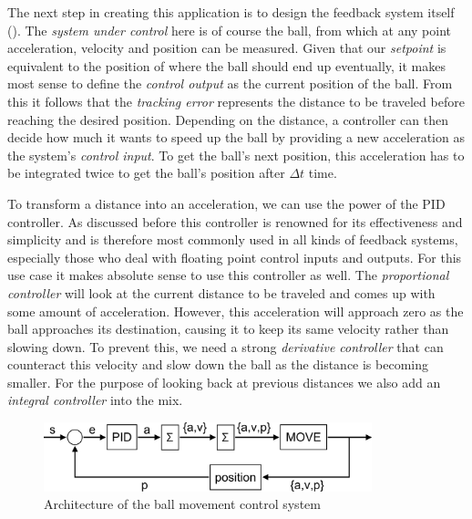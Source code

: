 The next step in creating this application is to design the feedback system itself (). The \textit{system under control} here is of course the ball, from which at any point acceleration, velocity and position can be measured. Given that our \textit{setpoint} is equivalent to the position of where the ball should end up eventually, it makes most sense to define the \textit{control output} as the current position of the ball. From this it follows that the \textit{tracking error} represents the distance to be traveled before reaching the desired position. Depending on the distance, a controller can then decide how much it wants to speed up the ball by providing a new acceleration as the system's \textit{control input}. To get the ball's next position, this acceleration has to be integrated twice to get the ball's position after $\Delta t$ time.

To transform a distance into an acceleration, we can use the power of the PID controller. As discussed before this controller is renowned for its effectiveness and simplicity and is therefore most commonly used in all kinds of feedback systems, especially those who deal with floating point control inputs and outputs. For this use case it makes absolute sense to use this controller as well. The \textit{proportional controller} will look at the current distance to be traveled and comes up with some amount of acceleration. However, this acceleration will approach zero as the ball approaches its destination, causing it to keep its same velocity rather than slowing down. To prevent this, we need a strong \textit{derivative controller} that can counteract this velocity and slow down the ball as the distance is becoming smaller. For the purpose of looking back at previous distances we also add an \textit{integral controller} into the mix.

\begin{figure}[H]
	\begin{center}
		\includegraphics[width=0.85\textwidth]{figures/BallTracker-diagram.png}
	\end{center}
	\caption{Architecture of the ball movement control system}
	\label{fig:balltracker-diagram}
\end{figure}

